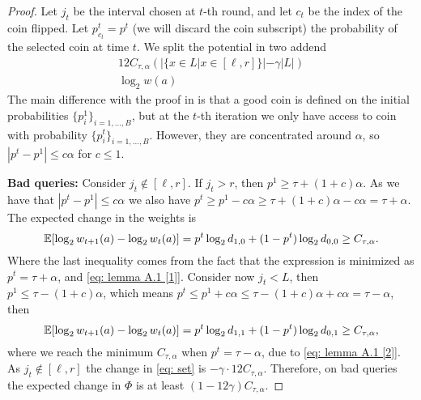 \begin{proof}
Let $j_t$ be the interval chosen at $t$-th round, and let $c_t$ be the index of the coin flipped. Let $p^t_{c_t} = p^t$ (we will discard the coin subscript) the probability of the selected coin at time $t$. We split the potential in two addend
\begin{gather}
    \label{eq: set}
    12 C_{\tau, \alpha}(|\{x\in L | x \in [\ell,r]\}|-\gamma|L|)\\
    \label{eq: log weight}
    \log_2 w(a)
\end{gather}
The main difference with the proof in \cite{gretta2023sharp} is that a good coin is defined on the initial probabilities $\{p^1_i\}_{i=1, \dots, B}$, but at the $t$-th iteration we only have access to coin with probability $\{p^t_i\}_{i=1,\dots,B}$. However, they are concentrated around $\alpha$, so $|p^t-p^1|\leq c\alpha$ for $c\leq 1$.

{\bf Bad queries:} Consider $j_t \notin [\ell, r]$. If $j_t>r$, then $p^1\geq \tau + (1+c)\alpha$. As we have that $|p^t-p^1|\leq c\alpha$ we also have $p^t \geq p^1-c\alpha \geq \tau+(1+c)\alpha-c\alpha=\tau+\alpha$. The expected change in the weights is
\begin{equation*}
    \mathbb{E}[\log_2 w_{t+1}(a)- \log_2 w_{t}(a)] = p^t \log_2 d_{1,0} + (1-p^t)\log_2 d_{0,0}\geq C_{\tau, \alpha}.
\end{equation*}
Where the last inequality comes from the fact that the expression is minimized as $p^{t}=\tau+\alpha$, and \autoref{eq: lemma A.1 [1]}. Consider now $j_t<L$, then $p^1\leq \tau-(1+c)\alpha$, which means $p^t \leq p^1+c\alpha \leq \tau-(1+c)\alpha + c\alpha = \tau-\alpha$, then 
\begin{equation*}
    \mathbb{E}[\log_2 w_{t+1}(a)- \log_2 w_{t}(a)] = p^t \log_2 d_{1,1} + (1-p^t)\log_2 d_{0,1}\geq C_{\tau, \alpha},
\end{equation*}
where we reach the minimum $C_{\tau, \alpha}$ when $p^t=\tau-\alpha$, due to \autoref{eq: lemma A.1 [2]}. As $j_t \notin [\ell,r]$ the change in \autoref{eq: set} is $-\gamma \cdot 12 C_{\tau,\alpha}$. Therefore, on bad queries the expected change in $\Phi$ is at least $(1-12\gamma)C_{\tau, \alpha}$.


\end{proof}
